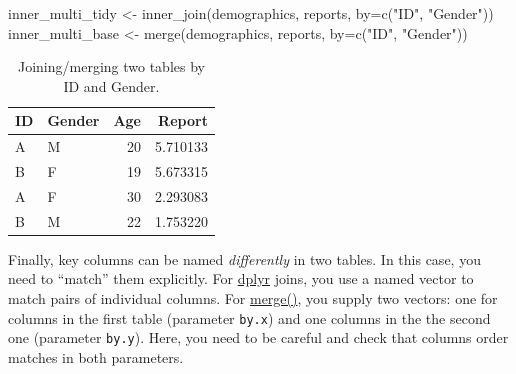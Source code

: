 \documentclass[
]{book}
\newenvironment{Shaded}{\begin{snugshade}}{\end{snugshade}}
\newcommand{\AttributeTok}[1]{\textcolor[rgb]{0.77,0.63,0.00}{#1}}
\newcommand{\FunctionTok}[1]{\textcolor[rgb]{0.00,0.00,0.00}{#1}}
\newcommand{\NormalTok}[1]{#1}
\newcommand{\OtherTok}[1]{\textcolor[rgb]{0.56,0.35,0.01}{#1}}
\newcommand{\StringTok}[1]{\textcolor[rgb]{0.31,0.60,0.02}{#1}}
\begin{document}
\begin{Shaded}
\begin{Highlighting}[]
\NormalTok{inner\_multi\_tidy }\OtherTok{\textless{}{-}} \FunctionTok{inner\_join}\NormalTok{(demographics, reports, }\AttributeTok{by=}\FunctionTok{c}\NormalTok{(}\StringTok{"ID"}\NormalTok{, }\StringTok{"Gender"}\NormalTok{))}
\NormalTok{inner\_multi\_base }\OtherTok{\textless{}{-}} \FunctionTok{merge}\NormalTok{(demographics, reports, }\AttributeTok{by=}\FunctionTok{c}\NormalTok{(}\StringTok{"ID"}\NormalTok{, }\StringTok{"Gender"}\NormalTok{))}
\end{Highlighting}
\end{Shaded}

\begin{table}

\caption{\label{tab:unnamed-chunk-199}Joining/merging two tables by ID and Gender.}
\centering
\begin{tabular}[t]{l|l|r|r}
\hline
ID & Gender & Age & Report\\
\hline
A & M & 20 & 5.710133\\
\hline
B & F & 19 & 5.673315\\
\hline
A & F & 30 & 2.293083\\
\hline
B & M & 22 & 1.753220\\
\hline
\end{tabular}
\end{table}

Finally, key columns can be named \emph{differently} in two tables. In this case, you need to ``match'' them explicitly. For \href{https://dplyr.tidyverse.org/reference/mutate-joins.html}{dplyr} joins, you use a named vector to match pairs of individual columns. For \href{https://stat.ethz.ch/R-manual/R-devel/library/base/html/merge.html}{merge()}, you supply two vectors: one for columns in the first table (parameter \texttt{by.x}) and one columns in the the second one (parameter \texttt{by.y}). Here, you need to be careful and check that columns order matches in both parameters.
\end{document}
